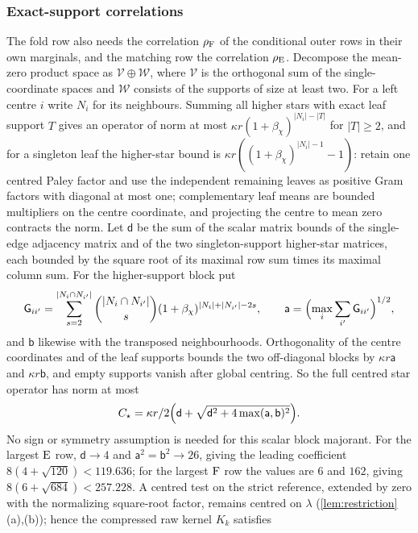 \subsubsection{Exact-support correlations}\label{subsec:row-anova-correlation}
The fold row also needs the correlation $\rho_{\rm F}$ of the conditional outer rows in
their own marginals, and the matching row the correlation $\rho_{\rm E}$. Decompose the
mean-zero product space as $\mathcal V\oplus\mathcal W$, where $\mathcal V$ is the
orthogonal sum of the single-coordinate spaces and $\mathcal W$ consists of the supports
of size at least two. For a left centre $i$ write $N_i$ for its neighbours. Summing all
higher stars with exact leaf support $T$ gives an operator of norm at most
$\kappa r(1+\beta_\chi)^{|N_i|-|T|}$ for $|T|\ge2$, and for a singleton leaf the
higher-star bound is $\kappa r((1+\beta_\chi)^{|N_i|-1}-1)$: retain one centred Paley
factor and use the independent remaining leaves as positive Gram factors with diagonal at
most one; complementary leaf means are bounded multipliers on the centre coordinate, and
projecting the centre to mean zero contracts the norm. Let $\mathsf d$ be the sum of the
scalar matrix bounds of the single-edge adjacency matrix and of the two singleton-support
higher-star matrices, each bounded by the square root of its maximal row sum times its
maximal column sum. For the higher-support block put
\[
 \mathsf G_{ii'}=\sum_{s=2}^{|N_i\cap N_{i'}|}\binom{|N_i\cap N_{i'}|}s
 (1+\beta_\chi)^{|N_i|+|N_{i'}|-2s},\qquad
 \mathsf a=\Bigl(\max_i\sum_{i'}\mathsf G_{ii'}\Bigr)^{1/2},
\]
and $\mathsf b$ likewise with the transposed neighbourhoods. Orthogonality of the centre
coordinates and of the leaf supports bounds the two off-diagonal blocks by $\kappa r\mathsf a$
and $\kappa r\mathsf b$, and empty supports vanish after global centring. So the full
centred star operator has norm at most
\begin{equation}\label{eq:row-anova-stars}
 C_\star=\frac{\kappa r}2\Bigl(\mathsf d+\sqrt{\mathsf d^2+4\max(\mathsf a,\mathsf b)^2}\Bigr).
\end{equation}
No sign or symmetry assumption is needed for this scalar block majorant. For the largest
$\rm E$ row, $\mathsf d\to4$ and $\mathsf a^2=\mathsf b^2\to26$, giving the leading
coefficient $8(4+\sqrt{120})<119.636$; for the largest $\rm F$ row the values are $6$ and
$162$, giving $8(6+\sqrt{684})<257.228$. A centred test on the strict reference, extended
by zero with the normalizing square-root factor, remains centred on $\lambda$
(\cref{lem:restriction}(a),(b)); hence the compressed raw kernel $K_k$ satisfies
